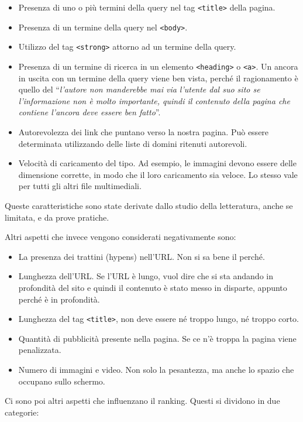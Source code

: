 \begin{itemize}
	\item Presenza di uno o più termini della query nel tag \texttt{<title>} della pagina.
	\item Presenza di un termine della query nel \texttt{<body>}.
	\item Utilizzo del tag \texttt{<strong>} attorno ad un termine della query.
	\item Presenza di un termine di ricerca in un elemento \texttt{<heading>} o \texttt{<a>}. Un ancora in uscita con un termine della query viene ben vista, perché il ragionamento è quello del ``\textit{l'autore non manderebbe mai via l'utente dal suo sito se l'informazione non è molto importante, quindi il contenuto della pagina che contiene l'ancora deve essere ben fatto}''.
	\item Autorevolezza dei link che puntano verso la nostra pagina. Può essere determinata utilizzando delle liste di domini ritenuti autorevoli.
	\item Velocità di caricamento del tipo. Ad esempio, le immagini devono essere delle dimensione corrette, in modo che il loro caricamento sia veloce. Lo stesso vale per tutti gli altri file multimediali.
\end{itemize}

Queste caratteristiche sono state derivate dallo studio della letteratura, anche se limitata, e da prove pratiche.

Altri aspetti che invece vengono considerati negativamente sono:

\begin{itemize}
	\item La presenza dei trattini (hypens) nell'URL. Non si sa bene il perché.
	\item Lunghezza dell'URL. Se l'URL è lungo, vuol dire che si sta andando in profondità del sito e quindi il contenuto è stato messo in disparte, appunto perché è in profondità.
	\item Lunghezza del tag \texttt{<title>}, non deve essere né troppo lungo, né troppo corto.
	\item Quantità di pubblicità presente nella pagina. Se ce n'è troppa la pagina viene penalizzata.
	\item Numero di immagini e video. Non solo la pesantezza, ma anche lo spazio che occupano sullo schermo.
\end{itemize}

Ci sono poi altri aspetti che influenzano il ranking. Questi si dividono in due categorie:

